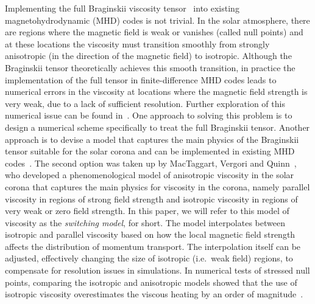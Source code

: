 Implementing the full Braginskii viscosity
tensor~\cite{braginskiiTransportProcessesPlasma1965} into existing
magnetohydrodynamic (MHD) codes is not trivial. In the solar
atmosphere, there are regions where the magnetic field is weak or
vanishes (called null points) and at these locations the viscosity must
transition smoothly from strongly anisotropic (in the direction of the
magnetic field) to isotropic. Although the Braginskii tensor theoretically achieves
this smooth transition, in practice the implementation
of the full tensor in finite-difference MHD codes leads to numerical
errors in the viscosity at locations where the magnetic field strength
is very weak, due to a lack of sufficient resolution. Further
exploration of this numerical issue can be found
in~\cite{mactaggartBraginskiiMagnetohydrodynamicsArbitrary2017}. One
approach to solving this problem is to design a numerical scheme
specifically to treat the full Braginskii tensor. Another approach is
to devise a model that captures the main physics of the Braginskii
tensor suitable for the solar corona and can be implemented in
existing MHD codes~\cite{hollwegViscosityMagnetizedPlasma1985}. The
second option was taken up by MacTaggart, Vergori and
Quinn~\cite{mactaggartBraginskiiMagnetohydrodynamicsArbitrary2017},
who developed a phenomenological model of anisotropic viscosity in the
solar corona that captures the main physics for viscosity in the
corona, namely parallel viscosity in regions of strong field strength and isotropic viscosity in regions of very weak or zero field strength. In this paper, we will refer to this model of viscosity as the \textit{switching model}, for short. The model interpolates between isotropic and parallel viscosity based on how the local magnetic field strength affects the distribution of momentum transport. The interpolation itself can be adjusted, effectively changing the size of isotropic (i.e.\ weak field) regions, to compensate for resolution issues in simulations. In numerical tests of stressed null points, comparing the isotropic and anisotropic models showed that the use of isotropic viscosity overestimates the viscous heating by an order of magnitude~\cite{mactaggartBraginskiiMagnetohydrodynamicsArbitrary2017}.

